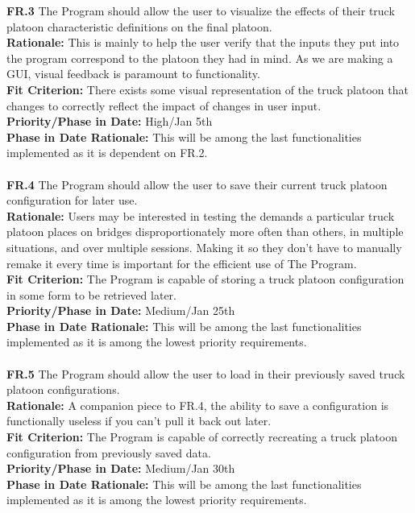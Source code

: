 \documentclass[12pt]{article}
\begin{document}
  \noindent\textbf{FR.3} The Program should allow the user to visualize the effects of their truck platoon characteristic definitions on the final platoon.\\
  \textbf{Rationale:} This is mainly to help the user verify that the inputs they put into the program correspond to the platoon they had in mind. As we are making a GUI,
  visual feedback is paramount to functionality.\\
  \textbf{Fit Criterion:} There exists some visual representation of the truck platoon that changes to correctly reflect the impact of changes in user input.\\
  \textbf{Priority/Phase in Date:} High/Jan 5th\\
  \textbf{Phase in Date Rationale:} This will be among the last functionalities implemented as it is dependent on FR.2.\\\\

  \noindent\textbf{FR.4} The Program should allow the user to save their current truck platoon configuration for later use.\\
  \textbf{Rationale:} Users may be interested in testing the demands a particular truck platoon places on bridges disproportionately more often than others,
   in multiple situations, and over multiple sessions. Making it so they don't have to manually remake it every time is important for the efficient use of The Program.\\
  \textbf{Fit Criterion:} The Program is capable of storing a truck platoon configuration in some form to be retrieved later.\\
  \textbf{Priority/Phase in Date:} Medium/Jan 25th\\
  \textbf{Phase in Date Rationale:} This will be among the last functionalities implemented as it is among the lowest priority requirements.\\\\

  \noindent\textbf{FR.5} The Program should allow the user to load in their previously saved truck platoon configurations.\\
  \textbf{Rationale:} A companion piece to FR.4, the ability to save a configuration is functionally useless if you can't pull it back out later.\\
  \textbf{Fit Criterion:} The Program is capable of correctly recreating a truck platoon configuration from previously saved data.\\
  \textbf{Priority/Phase in Date:} Medium/Jan 30th\\
  \textbf{Phase in Date Rationale:} This will be among the last functionalities implemented as it is among the lowest priority requirements.\\\\
\end{document}
